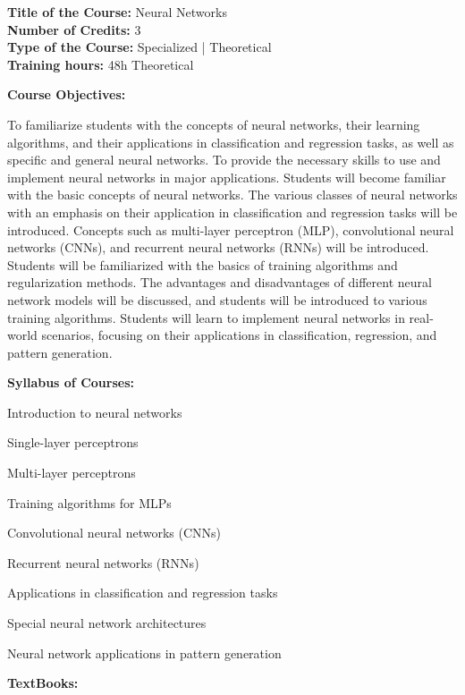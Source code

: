\documentclass[12pt,a4paper]{article}
\begin{document}
\newpage
\textbf{Title of the Course:} Neural Networks\\
\textbf{Number of Credits:} 3\\
\textbf{Type of the Course:} Specialized | Theoretical\\
\textbf{Training hours:} 48h Theoretical\par\vspace{4pt}
\textbf{Course Objectives:}\par\vspace{2pt}
To familiarize students with the concepts of neural networks, their learning
algorithms, and their applications in classification and regression tasks, as well as
specific and general neural networks.
To provide the necessary skills to use and implement neural networks in major
applications.
Students will become familiar with the basic concepts of neural networks.
The various classes of neural networks with an emphasis on their application in
classification and regression tasks will be introduced.
Concepts such as multi-layer perceptron (MLP), convolutional neural networks
(CNNs), and recurrent neural networks (RNNs) will be introduced.
Students will be familiarized with the basics of training algorithms and regularization
methods.
The advantages and disadvantages of different neural network models will be
discussed, and students will be introduced to various training algorithms.
Students will learn to implement neural networks in real-world scenarios, focusing on
their applications in classification, regression, and pattern generation.\par\vspace{4pt}
\textbf{Syllabus of Courses:}\par\vspace{2pt}
Introduction to neural networks\par
Single-layer perceptrons\par
Multi-layer perceptrons\par
Training algorithms for MLPs\par
Convolutional neural networks (CNNs)\par
Recurrent neural networks (RNNs)\par
Applications in classification and regression tasks\par
Special neural network architectures\par
Neural network applications in pattern generation\par\vspace{4pt}
\textbf{TextBooks:}\par\vspace{2pt}
\end{document}
